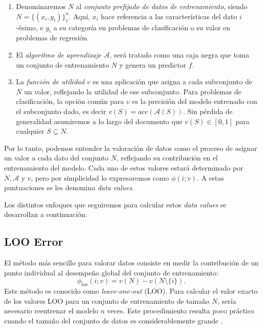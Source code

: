 \begin{enumerate}
  \item  Denominaremos $N$ al \emph{conjunto prefijado de datos
  de entrenamiento}, siendo $N = \{ (x_i, y_i) \}_1^n$.
  Aquí, $x_i$ hace referencia a las características del dato
  $i$-ésimo, e $y_i$ a su categoría en problemas de
  clasificación o su valor en problemas de regresión.
  
  \item El \emph{algoritmo de aprendizaje}  $\mathcal{A}$,
  será tratado como una caja negra que toma un conjunto de
  entrenamiento $N$ y genera un predictor $f$.
    
  
  \item La \emph{función de utilidad} $v$ es una aplicación
  que asigna a cada subconjunto de $N$ un valor, reflejando
  la utilidad de ese subconjunto. Para problemas de clasificación,
  la opción común para $v$ es la precisión del modelo
  entrenado con el subconjunto dado, es decir
  $v(S) = acc (\mathcal{A} (S))$. Sin pérdida de generalidad
  asumiremos a lo largo del documento que $v (S) \in [0, 1]$
  para cualquier $S \subseteq N$. 
\end{enumerate}

Por lo tanto, podemos entender la valoración de datos como el
proceso de asignar un valor a cada dato del conjunto $N$,
reflejando su contribución en el entrenamiento del modelo.
Cada uno de estos valores estará determinado por $N,
\mathcal{A}$ y $v$, pero por simplicidad lo expresaremos
como $\phi(i ; v)$. A estas puntuaciones se les denomina
\textit{data values}. 

Los distintos enfoques que seguiremos para calcular estos
\textit{data values} se desarrollan a continuación.

\subsection*{LOO Error}

El método más sencillo para valorar datos consiste en medir la
contribución de un punto individual al desempeño global del
conjunto de entrenamiento: 
\[
  \phi_{{loo}} (i ; v) = v (N) - v (N \setminus \{i\}).
\]
Este método es conocido como \textit{leave-one-out} (LOO). 
Para calcular el valor exacto de los valores LOO para
un conjunto de entrenamiento de tamaño $N$, sería
necesario reentrenar el modelo $n$ veces. Este procedimiento
resulta poco práctico cuando el tamaño del conjunto de datos
es considerablemente grande \cite{looFuck}.

